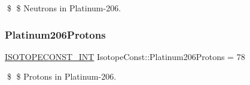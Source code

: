 \$ \$ Neutrons in Platinum-\/206. \mbox{\label{group___isotope_const-_platinum-_pt206_gadded7be060515dc6efa4d2dde48b43c3}} 
\subsubsection{\texorpdfstring{Platinum206\+Protons}{Platinum206Protons}}
{\footnotesize\ttfamily \mbox{\hyperlink{group___isotope_const-_macros_ga5f18360b3e99483a35c32d789e62621c}{I\+S\+O\+T\+O\+P\+E\+C\+O\+N\+S\+T\+\_\+\+I\+NT}} Isotope\+Const\+::\+Platinum206\+Protons = 78}

\$ \$ Protons in Platinum-\/206. 